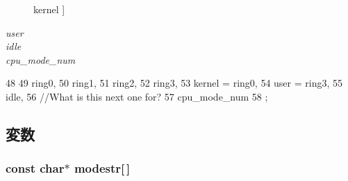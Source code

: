 \begin{Desc}
\begin{description}
{{kernel}
\label{namespaceX86ISA_1_1Kernel_aa1fc3805dac6f71f457fbbc263105bf6adb0339d028e596254368234e5ab09f9d}
}]\item[{\em 
\hypertarget{namespaceX86ISA_1_1Kernel_aa1fc3805dac6f71f457fbbc263105bf6a04981b8c09a50ccfb1d92fc11b81c36a}{
user}
\label{namespaceX86ISA_1_1Kernel_aa1fc3805dac6f71f457fbbc263105bf6a04981b8c09a50ccfb1d92fc11b81c36a}
}]\item[{\em 
\hypertarget{namespaceX86ISA_1_1Kernel_aa1fc3805dac6f71f457fbbc263105bf6a0e9a37114c0e458d28d52f06ec0f2242}{
idle}
\label{namespaceX86ISA_1_1Kernel_aa1fc3805dac6f71f457fbbc263105bf6a0e9a37114c0e458d28d52f06ec0f2242}
}]\item[{\em 
\hypertarget{namespaceX86ISA_1_1Kernel_aa1fc3805dac6f71f457fbbc263105bf6a4572f7cf10830e04921c8896f22102ba}{
cpu\_\-mode\_\-num}
\label{namespaceX86ISA_1_1Kernel_aa1fc3805dac6f71f457fbbc263105bf6a4572f7cf10830e04921c8896f22102ba}
}]\end{description}
\end{Desc}




\begin{DoxyCode}
48               {
49     ring0,
50     ring1,
51     ring2,
52     ring3,
53     kernel = ring0,
54     user = ring3,
55     idle,
56     //What is this next one for?
57     cpu_mode_num
58 };
\end{DoxyCode}


\subsection{変数}
\hypertarget{namespaceX86ISA_1_1Kernel_aaab5092bc6d1c40a90ff4c7450649ace}{
\subsubsection[{modestr}]{\setlength{\rightskip}{0pt plus 5cm}const char$\ast$ {\bf modestr}\mbox{[}$\,$\mbox{]}}}
\label{namespaceX86ISA_1_1Kernel_aaab5092bc6d1c40a90ff4c7450649ace}
